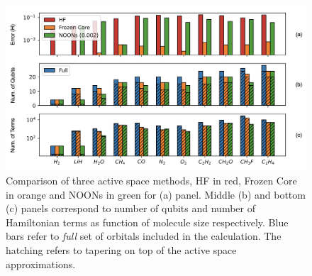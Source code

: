 \documentclass[journal,onecolumn]{IEEEtran}
\begin{document}
\begin{figure}[!htb]
	\centering
	\includegraphics[width=\textwidth]{cr_qubit_reduction_screen.png}
	\caption{Comparison of three active space methods, HF in red, Frozen Core in orange and NOONs in green for (a) panel. Middle (b) and bottom (c) panels correspond to number of qubits and number of Hamiltonian terms as function of molecule size respectively. Blue bars refer to \textit{full} set of orbitals included in the calculation. The hatching refers to tapering on top of the active space
approximations.}
	\label{fig:comparison_of_active_space_methods}
\end{figure}

\end{document}
